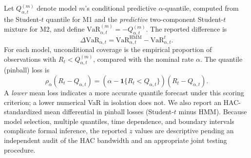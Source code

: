 \documentclass[11pt,a4paper]{article}
\begin{document}
Let $Q^{(m)}_{\alpha,t}$ denote model $m$'s conditional predictive $\alpha$-quantile, computed from the Student-$t$ quantile for M1 and the \emph{predictive} two-component Student-$t$ mixture for M2, and define $\mathrm{VaR}^{(m)}_{\alpha,t}=-Q^{(m)}_{\alpha,t}$. The reported difference is
\begin{equation}\label{eq:var_diff}
\Delta\mathrm{VaR}_{\alpha,t}=\mathrm{VaR}^{\mathrm{HMM}}_{\alpha,t}-\mathrm{VaR}^{t}_{\alpha,t}.
\end{equation}
For each model, unconditional coverage is the empirical proportion of observations with $R_t<Q^{(m)}_{\alpha,t}$, compared with the nominal rate $\alpha$. The quantile (pinball) loss is
\begin{equation}\label{eq:pinball}
\rho_\alpha(R_t-Q_{\alpha,t})=(\alpha-\mathbf{1}\{R_t<Q_{\alpha,t}\})(R_t-Q_{\alpha,t}).
\end{equation}
A \emph{lower} mean loss indicates a more accurate quantile forecast under this scoring criterion; a lower numerical VaR in isolation does not. We also report an HAC-standardized mean differential in pinball losses (Student-$t$ minus HMM). Because model selection, multiple quantiles, time dependence, and boundary intervals complicate formal inference, the reported $z$ values are descriptive pending an independent audit of the HAC bandwidth and an appropriate joint testing procedure.
\end{document}
